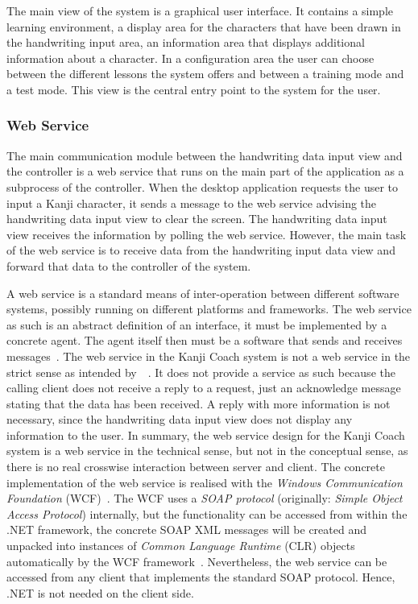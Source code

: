 The main view of the system is a graphical user interface. It contains 
a simple learning environment, a display area for the characters that have 
been drawn in the handwriting input area, an information area that displays 
additional information about a character. In a configuration area the user can 
choose between the different lessons the system offers and between a training 
mode and a test mode. This view is the central entry point to the system for
the user.

\subsubsection{Web Service}
\label{sec:arch:webservice}

The main communication module between the handwriting data input view and the 
controller is a web service that runs on the main part of the application
as a subprocess of the controller. When the desktop application requests the 
user to input a Kanji character, it sends a message to the web service 
advising the handwriting data input view to clear the screen. 
The handwriting data input view receives the information by polling the 
web service. However, the main task of the web service is to receive data 
from the handwriting input data view and forward that data to the controller
of the system. 

A web service is a standard means of inter-operation between different software
systems, possibly running on different platforms and frameworks. The web service
as such is an abstract definition of an interface, it must be implemented by a 
concrete agent. The agent itself then must be a software that sends and receives 
messages~.
The web service in the Kanji Coach system is not a web service in the strict 
sense as intended by~~\citeyear{W3C2004}. It does not 
provide a service as such because the calling client does not receive a reply 
to a request, just an acknowledge message stating that the data has been 
received. 
A reply with more information is not necessary, since the handwriting data 
input view does not display any information to the user. 
In summary, the web service design for the Kanji Coach system is a web service
in the technical sense, but not in the conceptual sense, as there is no real
crosswise interaction between server and client.
The concrete implementation of the web service is realised with the
\emph{Windows Communication Foundation} (WCF)~.
The WCF uses a \emph{SOAP protocol} (originally: 
\emph{Simple Object Access Protocol}) internally, but the functionality can be 
accessed from within the .NET framework, the concrete SOAP XML messages will 
be created and unpacked into instances of \emph{Common Language Runtime} (CLR) 
objects automatically by the WCF 
framework~.
Nevertheless, the web service can be accessed from any client that implements
the standard SOAP protocol. Hence, .NET is not needed on the client side.

